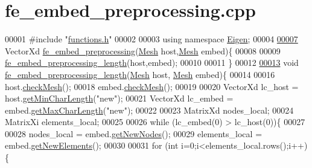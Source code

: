 \hypertarget{fe__embed__preprocessing_8cpp_source}{}\section{fe\+\_\+embed\+\_\+preprocessing.\+cpp}
\label{fe__embed__preprocessing_8cpp_source}

\begin{DoxyCode}
00001 \textcolor{preprocessor}{#include "\hyperlink{functions_8h}{functions.h}"}
00002 
00003 \textcolor{keyword}{using namespace }\hyperlink{namespace_eigen}{Eigen};
00004 
\hyperlink{fe__embed__preprocessing_8cpp_a840ddc7df1916f6b5dfbb141adac32d3}{00007} VectorXd \hyperlink{fe__embed__preprocessing_8cpp_a840ddc7df1916f6b5dfbb141adac32d3}{fe\_embed\_preprocessing}(\hyperlink{class_mesh}{Mesh} host,\hyperlink{class_mesh}{Mesh} embed)\{
00008 
00009     \hyperlink{fe__embed__preprocessing_8cpp_a50e8d7839525058d40e3a53f9d5de77c}{fe\_embed\_preprocessing\_length}(host,embed);
00010 
00011 \}
00012 
\hyperlink{fe__embed__preprocessing_8cpp_a50e8d7839525058d40e3a53f9d5de77c}{00013} \textcolor{keywordtype}{void} \hyperlink{fe__embed__preprocessing_8cpp_a50e8d7839525058d40e3a53f9d5de77c}{fe\_embed\_preprocessing\_length}(\hyperlink{class_mesh}{Mesh} host, 
      \hyperlink{class_mesh}{Mesh} embed)\{
00014 
00016     host.\hyperlink{class_mesh_a894e41dd4280dfba75406eb8d0338a8e}{checkMesh}();
00018     embed.\hyperlink{class_mesh_a894e41dd4280dfba75406eb8d0338a8e}{checkMesh}();
00019 
00020     VectorXd lc\_host = host.\hyperlink{class_mesh_a94ce58cb2598b1db2973ad357dae2710}{getMinCharLength}(\textcolor{stringliteral}{"new"});
00021     VectorXd lc\_embed = embed.\hyperlink{class_mesh_a72d2a3863b85a2a2aed7deca8ce37832}{getMaxCharLength}(\textcolor{stringliteral}{"new"});
00022 
00023     MatrixXd nodes\_local;
00024     MatrixXi elements\_local;
00025 
00026     \textcolor{keywordflow}{while} (lc\_embed(0) > lc\_host(0))\{
00027 
00028         nodes\_local = embed.\hyperlink{class_mesh_a52ecce406bbef80cbf3610db3ea5ea40}{getNewNodes}();
00029         elements\_local = embed.\hyperlink{class_mesh_a6e425e9499e64ab52c4555aa3763651d}{getNewElements}();
00030 
00031         \textcolor{keywordflow}{for} (\textcolor{keywordtype}{int} i=0;i<elements\_local.rows();i++)\{

\end{DoxyCode}
